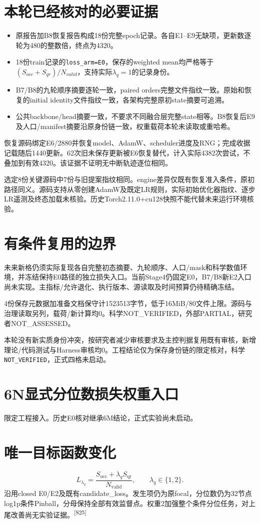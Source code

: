 \documentclass[UTF8,10.5pt,a4paper,fontset=none]{ctexart}
\newcommand{\evi}[1]{\textsuperscript{\color{muted}[#1]}}
\newcommand{\pageheading}[2]{\clearpage\section*{#1}\textcolor{muted}{#2}\par\vspace{3pt}}
\begin{document}
\section*{本轮已经核对的必要证据}
\begin{itemize}
\item 原报告加B8恢复报告构成18份完整epoch记录。各自E1--E9无缺项，更新数逐轮为480的整数倍，终点为4320。
\item 18份train记录的\texttt{loss\_arm=E0}，保存的weighted mean均严格等于$(S_{occ}+S_{qr})/N_{valid}$，支持实际$\lambda_q=1$的记录身份。
\item B7/B8的九轮顺序摘要逐轮一致，paired orders完整文件指纹一致。原始和恢复的initial identity文件指纹一致，各架构完整原初state摘要可追溯。
\item 公共backbone/head摘要一致，不要求不同融合层完整state相等。B8恢复后E9及人口/manifest摘要沿原身份链一致，权重载荷本轮未读取或重哈希。
\end{itemize}

恢复源码绑定E6/2880并恢复model、AdamW、scheduler进度及RNG；完成收据记载随后1440更新。62次旧未保存更新被E6恢复替代，计入实际4382次尝试，不叠加到有效4320。该证据不证明无中断轨迹逐位相同。

选定8份关键源码中7份与旧提案指纹相同。engine差异仅既有恢复准入条件，原初路径同义。源码支持从零创建AdamW及既定LR规则，实际初始优化器指纹、逐步LR遥测及终态加载未核验。历史Torch2.11.0+cu128快照不能代替未来运行环境核验。

\section*{有条件复用的边界}
未来新格仍须实际复现各自完整初态摘要、九轮顺序、人口/mask和科学数值环境，并冻结保持E0路径的独立损失入口。当前Stage4仍固定E0，B7/B8新E2入口尚未实现。主指标/允许退化、执行版本、源读取及时间预算仍待精确冻结。

4份保存元数据加准备文档保守计1523513字节，低于16MiB/80文件上限。源码与治理读取另列，载荷/新计算均0。科学NOT\_VERIFIED，外部PARTIAL，研究者NOT\_ASSESSED。

本轮没有新实质身份冲突，按研究者减少审核要求及主控判据复用既有审核，新增理论/代码测试与Harness审核均0。工程结论仅为保存身份链的限定核对，科学\texttt{NOT\_VERIFIED}，正式四格未启动。

\pageheading{6N\quad 显式分位数损失权重入口}{限定工程接入。历史E0核对继承6M结论，正式实验尚未启动。}
\section*{唯一目标函数变化}
\[
L_{\lambda_q}=\frac{S_{\mathrm{occ}}+\lambda_q S_{\mathrm{qr}}}{N_{\mathrm{valid}}},
\qquad \lambda_q\in\{1,2\}.
\]
沿用closed E0/E2及既有candidate\_loss。发生项仍为原focal，分位数仍为32节点log1p条件Pinball，分母保持全部有效监督点。权重2加强整个条件分位任务，对上尾改善尚无实验证据。\evi{S25}
\end{document}
